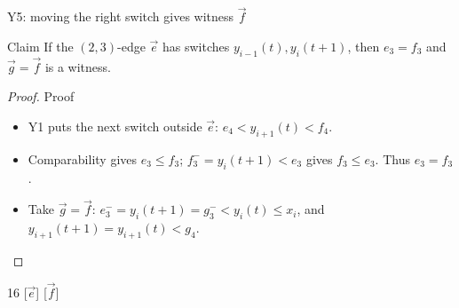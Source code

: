 \begin{frame}[t]{Y5: moving the right switch gives witness $\vec f$}
  \footnotesize{}
  \claimreminder{\Yone\Ytwo\Yfive\Ymovenotation}
  \begin{lemma}{Claim}
    If the $(2,3)$-edge $\vec e$ has switches $y_{i-1}(t),y_i(t+1)$,
    then $e_3=f_3$ and $\vec g=\vec f$ is a witness.
  \end{lemma}
  \begin{proof}{Proof}
    \begin{itemize}[itemsep=4pt]
      \item<1-> Y1 puts the next switch outside $\vec e$:
        $e_4<y_{i+1}(t)<f_4$.
      \item<2-> Comparability gives $e_3\leq f_3$;
        $f_3^-=y_i(t+1)<e_3$ gives $f_3\leq e_3$. Thus $e_3=f_3$.
      \item<3-> Take $\vec g=\vec f$:
        $e_3^-=y_i(t+1)=g_3^-<y_i(t)\leq x_i$,
        and $y_{i+1}(t+1)=y_{i+1}(t)<g_4$.
    \end{itemize}
  \end{proof}
  \begin{center}
    \begin{shiftchain}[
      column sep=6mm, row sep=6mm, dot radius=3pt,
      labels=false, label font=\scriptsize,
      switches={4,8,10/dashed,13},
      switch labels={4/$y_{i-1}(t)$,8/$y_i(t+1)$,10/\raisebox{-3.5mm}{$y_i(t)$},13/$y_{i+1}(t)$},
    ]{16}
      [$\vec e$]
      [$\vec f$]
    \end{shiftchain}
  \end{center}
\end{frame}

